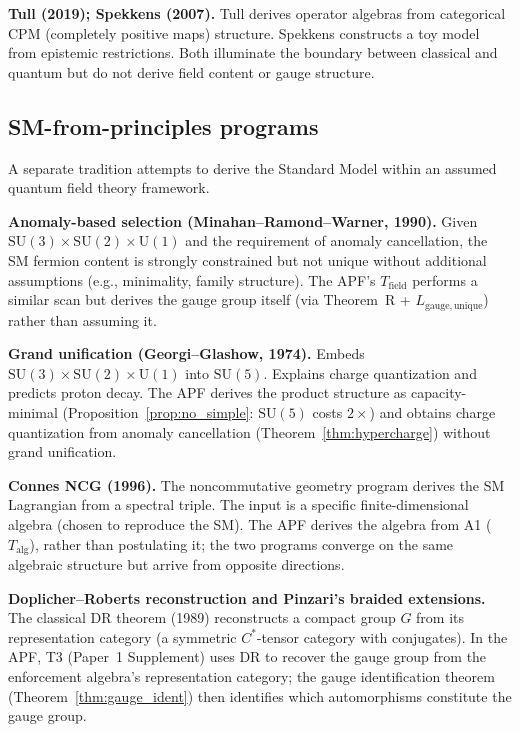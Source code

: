 \documentclass[11pt,a4paper]{article}
\theoremstyle{definition}
\newcommand{\SU}{\mathrm{SU}}
\newcommand{\U}{\mathrm{U}}
\begin{document}
\smallskip\noindent\textbf{Tull (2019); Spekkens (2007).}\quad
Tull derives operator algebras from categorical CPM (completely positive
maps) structure.  Spekkens constructs a toy model from epistemic
restrictions.  Both illuminate the boundary between classical and
quantum but do not derive field content or gauge structure.


\subsection{SM-from-principles programs}
\label{sec:sm_programs}

A separate tradition attempts to derive the Standard Model within an
assumed quantum field theory framework.

\smallskip\noindent\textbf{Anomaly-based selection
(Minahan--Ramond--Warner, 1990).}\quad
Given $\SU(3) \times \SU(2) \times \U(1)$ and the requirement of
anomaly cancellation, the SM fermion content is strongly constrained
but not unique without additional assumptions (e.g., minimality,
family structure).  The APF's $T_{\mathrm{field}}$ performs a similar
scan but derives the gauge group itself (via Theorem~R +
$L_{\mathrm{gauge,unique}}$) rather than assuming it.

\smallskip\noindent\textbf{Grand unification (Georgi--Glashow, 1974).}\quad
Embeds $\SU(3) \times \SU(2) \times \U(1)$ into $\SU(5)$.  Explains
charge quantization and predicts proton decay.  The APF derives the
product structure as capacity-minimal
(Proposition~\ref{prop:no_simple}: $\SU(5)$ costs $2\times$) and
obtains charge quantization from anomaly cancellation
(Theorem~\ref{thm:hypercharge}) without grand unification.

\smallskip\noindent\textbf{Connes NCG (1996).}\quad
The noncommutative geometry program derives the SM Lagrangian from a
spectral triple.  The input is a specific finite-dimensional algebra
(chosen to reproduce the SM).  The APF derives the algebra from A1
($T_{\mathrm{alg}}$), rather than postulating it; the two programs
converge on the same algebraic structure but arrive from opposite
directions.

\smallskip\noindent\textbf{Doplicher--Roberts reconstruction and
Pinzari's braided extensions.}\quad
The classical DR theorem (1989) reconstructs a compact group $G$ from
its representation category (a symmetric $C^*$-tensor category with
conjugates).  In the APF, T3 (Paper~1 Supplement) uses DR to recover
the gauge group from the enforcement algebra's representation
category; the gauge identification theorem
(Theorem~\ref{thm:gauge_ident}) then identifies which automorphisms
constitute the gauge group.
\end{document}
